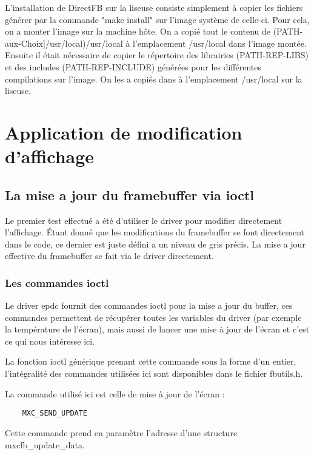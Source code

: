L'installation de DirectFB sur la liseuse consiste simplement à copier les fichiers générer par la commande "make install" sur l'image système de celle-ci. Pour cela, on a monter l'image sur la machine hôte. On a copié tout le contenu de (PATH-aux-Choix]/usr/local)/usr/local à l'emplacement /usr/local dans l'image montée. Ensuite il était nécessaire de copier le répertoire des librairies (PATH-REP-LIBS) et des includes (PATH-REP-INCLUDE) générées pour les différentes compilations sur l'image. On les a copiés dans à l'emplacement /usr/local sur la liseuse. 

\newpage

\section{Application de modification d'affichage} %


\subsection{La mise a jour du framebuffer via ioctl}

Le premier test effectué a été d'utiliser le driver pour modifier directement l'affichage.
Étant donné que les modifications du framebuffer se font directement dans le code, ce dernier est juste défini a un niveau de gris précis. La mise a jour effective du framebuffer se fait via le driver directement.

\subsubsection{Les commandes ioctl}

Le driver epdc fournit des commandes ioctl pour la mise a jour du buffer, ces commandes permettent de récupérer toutes les variables du driver (par exemple la température de l'écran), mais aussi de lancer une mise à jour de l'écran et c'est ce qui nous intéresse ici.

La fonction ioctl générique prenant cette commande sous la forme d'un entier, l'intégralité des commandes utilisées ici sont disponibles dans le fichier fbutils.h. %


La commande utilisé ici est celle de mise à jour de l'écran : 
\begin{lstlisting}
	MXC_SEND_UPDATE
\end{lstlisting}
Cette commande prend en paramètre l'adresse d'une structure mxcfb_update_data.

